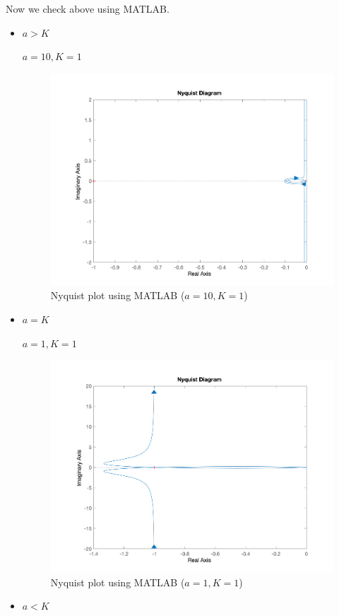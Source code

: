 Now we check above using MATLAB.
\begin{itemize}
	\item $a>K$
	
	$a = 10, K = 1$
	\begin{figure}[H]
		\caption{Nyquist plot using MATLAB ($a = 10, K = 1$)}
		\centering
		\includegraphics[width=12cm]{../Figure/Q2/MATLAB-Nyquist_a_bigger.png}
	\end{figure}
	\item $a = K$
	
	$a = 1, K = 1$
	\begin{figure}[H]
		\caption{Nyquist plot using MATLAB ($a = 1, K = 1$)}
		\centering
		\includegraphics[width=12cm]{../Figure/Q2/MATLAB-Nyquist.png}
	\end{figure}
	\item $a<K$
	

\end{itemize}
